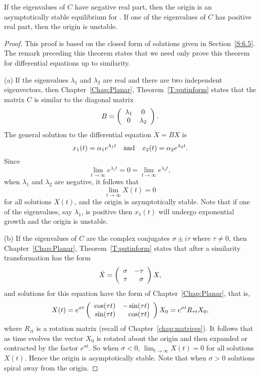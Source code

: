 \documentclass{ximera}
\begin{document}
\begin{thm}  \label{C:asympstlin}
If the eigenvalues of $C$ have negative real part, then the origin
is an asymptotically stable equilibrium for .
If one of the
eigenvalues of $C$ has positive real part, then the origin is unstable.
\end{thm}

\begin{proof}  This proof is based on the closed form of solutions given in
Section~\ref{S:6.5}.   The remark preceding this theorem states that we
need only prove this theorem for differential equations up to similarity.

\noindent (a) \quad If the eigenvalues $\lambda_1$ and $\lambda_2$ are real
and there are two independent eigenvectors, then Chapter~\ref{Chap:Planar},
Theorem~\ref{T:putinform} states that the matrix $C$ is similar to the
diagonal matrix
\[
B = \left(\begin{array}{cc} \lambda_1 & 0\\ 0 &\lambda_2\end{array}\right).
\]
The general solution to the differential equation $\dot{X}=BX$ is
\[
x_1(t) = \alpha_1e^{\lambda_1 t} \quad\mbox{and}\quad x_2(t) = \alpha_2e^{\lambda_2 t}.
\]
Since
\[
\lim_{t\to\infty}e^{\lambda_1 t} = 0  = \lim_{t\to\infty}e^{\lambda_2 t},
\]
when $\lambda_1$ and $\lambda_2$ are negative, it follows that
\[
\lim_{t\to\infty} X(t) = 0
\]
for all solutions $X(t)$, and the origin is asymptotically stable.  Note that
if one of the eigenvalues, say $\lambda_1$, is positive then $x_1(t)$ will
undergo exponential growth and the origin is unstable.

\noindent (b) \quad If the eigenvalues of $C$ are the complex conjugates
$\sigma\pm i\tau$ where $\tau\neq 0$, then Chapter~\ref{Chap:Planar},
Theorem~\ref{T:putinform} states that after a similarity transformation
 has the form
\[
\dot{X} = \left(\begin{array}{rr} \sigma & -\tau\\ \tau &\sigma\end{array}\right)X,
\]
and solutions for this equation have the form  of
Chapter~\ref{Chap:Planar}, that is,
\[
X(t) = e^{\sigma t}
\left(\begin{array}{rr} \cos(\tau t) & -\sin(\tau t)\\ \sin(\tau t) &\cos(\tau t)\end{array}\right)X_0
= e^{\sigma t}R_{\tau t}X_0,
\]
where $R_{\tau t}$ is a rotation matrix
(recall  of
Chapter~\ref{chap:matrices}).  It follows that as time evolves
the vector $X_0$ is rotated about the origin and then expanded or contracted
by the factor $e^{\sigma t}$.  So when $\sigma<0$, $\lim_{t\to\infty} X(t)=0$
for all solutions $X(t)$.  Hence the origin is asymptotically stable.  Note
that when $\sigma>0$ solutions spiral away from the origin.


\end{proof}
\end{document}
